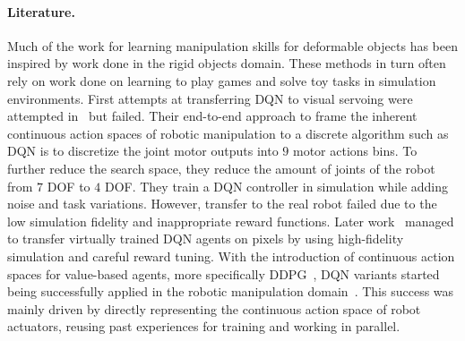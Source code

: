 \documentclass[\home/main.tex]{subfiles}
\begin{document}
\paragraph{Literature.}
Much of the work for learning manipulation skills for deformable objects has been inspired by work done in the rigid objects domain. These methods in turn often rely on work done on learning to play games and solve toy tasks in simulation environments. First attempts at transferring DQN to visual servoing were attempted in~\autocite{Zhang2015} but failed. Their end-to-end approach to frame the inherent continuous action spaces of robotic manipulation to a discrete algorithm such as DQN is to discretize the joint motor outputs into $9$ motor actions bins. To further reduce the search space, they reduce the amount of joints of the robot from $7$ DOF to $4$ DOF. They train a DQN controller in simulation while adding noise and task variations. However, transfer to the real robot failed due to the low simulation fidelity and inappropriate reward functions. Later work~\autocite{James2016} managed to transfer virtually trained DQN agents on pixels by using high-fidelity simulation and careful reward tuning. With the introduction of continuous action spaces for value-based agents, more specifically DDPG~\autocite{Lillicrap2015}, DQN variants started being successfully applied in the robotic manipulation domain~\autocite{Gu2017}. This success was mainly driven by directly representing the continuous action space of robot actuators, reusing past experiences for training and working in parallel.
\end{document}

